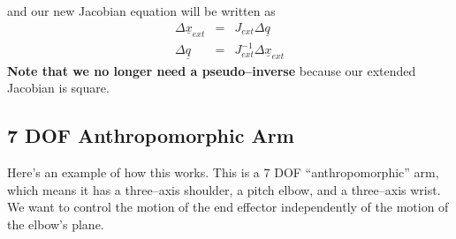 \documentclass[]{article}
\begin{document}
and our new Jacobian equation will be written as
\begin{eqnarray}
 \Delta\underline{x}_{ext} & = & J_{ext}\Delta\underline{q} \nonumber \\
 \Delta\underline{q} & = & J_{ext}^{-1}\Delta\underline{x}_{ext} \nonumber
\end{eqnarray}
\textbf{Note that we no longer need a pseudo--inverse} because our extended Jacobian is square. 

\subsection{7 DOF Anthropomorphic Arm}
Here's an example of how this works. This is a 7 DOF ``anthropomorphic'' arm, which means it has a three--axis shoulder, a pitch elbow, and a three--axis wrist. We want to control the motion of the end effector independently of the motion of the elbow's plane.
\end{document}
